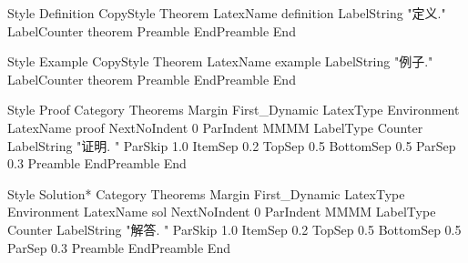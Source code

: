 Style Definition
    CopyStyle              Theorem
    LatexName             definition
    LabelString           "定义\thetheorem."
    LabelCounter             theorem
    Preamble
    EndPreamble
    End
    
Style Example
    CopyStyle              Theorem
    LatexName             example
    LabelString           "例子\thetheorem."
    LabelCounter             theorem
    Preamble
    EndPreamble
    End

Style Proof
    Category              Theorems
    Margin                First_Dynamic
    LatexType             Environment
    LatexName             proof
    NextNoIndent          0
    ParIndent             MMMM
    LabelType             Counter
    LabelString           "证明. "
    ParSkip               1.0
    ItemSep               0.2
    TopSep                0.5
    BottomSep             0.5
    ParSep                0.3
    Preamble
        \newenvironment{proof}{\noindent \\ \textbf{证明.} }{\hfill \#}
    EndPreamble
End

Style Solution*
    Category              Theorems
    Margin                First_Dynamic
    LatexType             Environment
    LatexName             sol
    NextNoIndent          0
    ParIndent             MMMM
    LabelType             Counter
    LabelString           "解答. "
    ParSkip               1.0
    ItemSep               0.2
    TopSep                0.5
    BottomSep             0.5
    ParSep                0.3
    Preamble
        \newenvironment{sol}{\noindent \\ \textbf{解答.} }{\hfill \#}
    EndPreamble
End
